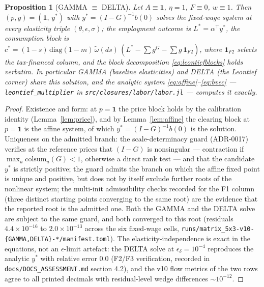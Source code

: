 \documentclass[11pt]{article}
\newtheorem{proposition}{Proposition}
\numberwithin{equation}{section}
\newcommand{\one}{\mathbf{1}}
\begin{document}
\begin{proposition}[GAMMA $\equiv$ DELTA]\label{prop:gd}
Let $A \equiv \one$, $\eta = 1$, $F \equiv 0$, $w \equiv 1$. Then
$(p,y) = (\one,\, y^{\ast})$ with
$y^{\ast} = (I - G)^{-1} b(0)$ solves the fixed-wage system at
\emph{every} elasticity triple $(\theta,\epsilon,\sigma)$; the employment
outcome is $L^{\ast} = \alpha^{\!\top} y^{\ast}$, the consumption block is
$c^{\ast} = (1-s)\,\mathrm{diag}(1-m)\,\tilde\omega(ds)\,
(L^{\ast} - \sum g^G - \sum g\,\mathbf{1}_{F2})$, where
$\mathbf{1}_{F2}$ selects the tax-financed column, and the block
decomposition \eqref{eq:leontiefblocks} holds verbatim. In particular GAMMA (baseline
elasticities) and DELTA (the Leontief corner) share this solution, and the
analytic system \eqref{eq:affine}--\eqref{eq:bvec} ---
\texttt{leontief\_multiplier} in \texttt{src/closures/labor/labor.jl} ---
computes it exactly.
\end{proposition}

\begin{proof}
Existence and form: at $p = \one$ the price block holds by the calibration
identity (Lemma~\ref{lem:price}), and by Lemma~\ref{lem:affine} the
clearing block at $p = \one$ is the affine system, of which
$y^{\ast} = (I-G)^{-1}b(0)$ is the solution. Uniqueness on the admitted
branch: the scale-determinacy guard (ADR-0017) verifies at the reference
prices that $(I - G)$ is nonsingular --- contraction if
$\max_u \mathrm{colsum}_u(G) < 1$, otherwise a direct rank test --- and
that the candidate $y^{\ast}$ is strictly positive;
\textcolor{revisionV3}{the guard admits the branch on which the affine fixed
point is unique and positive, but does not by itself exclude further roots of
the nonlinear system; the multi-init admissibility checks recorded for the F1
column (three distinct starting points converging to the same root) are the
evidence that the reported root is the admitted one.} Both the GAMMA and the DELTA solve
are subject to the same guard, and both converged to this root
\textcolor{revisionV3}{(residuals $4.4\times10^{-16}$ to $2.0\times10^{-13}$
across the six fixed-wage cells,
\texttt{runs/matrix\_5x3-v10-\{GAMMA,DELTA\}-*/manifest.toml})}. The
elasticity-independence is exact in the equations, not an $\epsilon$-limit
artefact: the DELTA solve at $\epsilon_\delta = 10^{-4}$ reproduces the
analytic $y^{\ast}$ with relative error $0.0$ (F2/F3 verification, recorded
in \texttt{docs/DOCS\_ASSESSMENT.md} section 4.2), and the \textcolor{revisionV3}{v10} flow metrics
of the two rows agree to all printed decimals with residual-level wedge
differences $\sim 10^{-12}$.
\end{proof}
\end{document}
